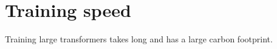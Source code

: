 \section{Training speed}
\label{appendix:training-speed}

Training large transformers takes long and has a large carbon footprint.